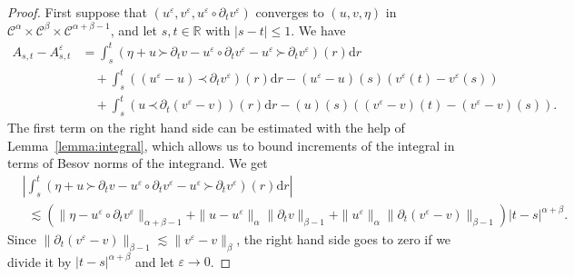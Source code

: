 \documentclass[a4paper,11pt]{article}
\newcommand{\mathd}{\mathrm{d}}
\theoremstyle{remark}
\newcommand{\CC}{\ensuremath{\mathscr{C}}}
\newcommand{\lpara}{\,\mathord{\prec}\,}
\newcommand{\rpara}{\,\mathord{\succ}\,}
\newcommand{\reso}{\,\mathord{\circ}\,}
\begin{document}
\begin{proof}
  First suppose that $( u^{\varepsilon} ,v^{\varepsilon} ,u^{\varepsilon} \reso \partial_{t} v^{\varepsilon} )$ converges to $( u,v, \eta )$ in
  $\CC^{\alpha} \times \CC^\beta \times \CC^{\alpha + \beta -1}$, and let $s, t \in \mathbb{R}$ with $| s-t | \leqslant 1$.
  We have
  \begin{align}\label{eq:classical rough path pr1} \nonumber
     A_{s,t} -A^{\varepsilon}_{s,t} %
     & = \int_{s}^{t} ( \eta +u \rpara \partial_{t} v-u^{\varepsilon} \reso  \partial_{t} v^{\varepsilon} -u^{\varepsilon} \rpara \partial_{t}  v^{\varepsilon} ) ( r ) \mathd r \\ \nonumber
     &\quad + \int_{s}^{t} ( ( u^{\varepsilon} -u ) \lpara \partial_{t} v^{\varepsilon} ) ( r ) \mathd r- ( u^{\varepsilon} -u ) ( s ) ( v^{\varepsilon} ( t ) -v^{\varepsilon} ( s ) ) \\
     &\quad + \int_{s}^{t} ( u \lpara \partial_{t} ( v^{\varepsilon} -v ) ) ( r ) \mathd r- ( u ) ( s ) ( ( v^{\varepsilon} -v ) ( t ) - ( v^{\varepsilon} -v ) ( s ) ) .
  \end{align}
  The first term on the right hand side can be estimated with the help of
  Lemma~\ref{lemma:integral}, which allows us to bound increments of the integral in terms of Besov norms of the integrand. We get
  \begin{align*}
     &\left| \int_{s}^{t} ( \eta +u \rpara \partial_{t} v-u^{\varepsilon} \reso  \partial_{t} v^{\varepsilon} -u^{\varepsilon} \rpara \partial_{t} v^{\varepsilon} ) ( r ) \mathd r \right| \\
     &\hspace{5pt} \lesssim ( \| \eta -u^{\varepsilon} \reso \partial_{t} v^{\varepsilon} \|_{\alpha + \beta -1} + \| u-u^{\varepsilon} \|_{\alpha} \| \partial_{t}  v \|_{\beta -1} + \| u^{\varepsilon} \|_{\alpha} \| \partial_{t} (v^{\varepsilon} -v ) \|_{\beta -1} ) | t-s |^{\alpha + \beta}.
  \end{align*}
  Since $\| \partial_{t} ( v^{\varepsilon} -v ) \|_{\beta -1} \lesssim \| v^{\varepsilon} -v \|_{\beta}$, the right hand side goes to zero if we divide it by $| t-s |^{\alpha + \beta}$ and let $\varepsilon \rightarrow 0$.
  

\end{proof}
\end{document}
